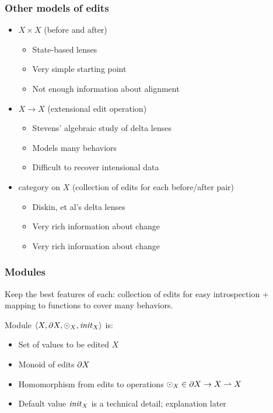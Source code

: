 \documentclass[table]{beamer}
\begin{document}
\begin{frame}
    \frametitle{Other models of edits}

    \begin{itemize}
        \item $X \times X$ (before and after)
            \begin{itemize}
                \item State-based lenses
                \item[\ybullet] Very simple starting point
                \item[\nbullet] Not enough information about alignment
            \end{itemize}
        \item $X \to X$ (extensional edit operation)
            \begin{itemize}
                \item Stevens' algebraic study of delta lenses
                \item[\ybullet] Models many behaviors
                \item[\nbullet] Difficult to recover intensional data
            \end{itemize}
        \item category on $X$ (collection of edits for each before/after
            pair)
            \begin{itemize}
                \item Diskin, et al's delta lenses
                \item[\ybullet] Very rich information about change
                \item[\nbullet] Very rich information about change
            \end{itemize}
    \end{itemize}
\end{frame}

\begin{frame}
    \frametitle{Modules}
    Keep the best features of each: collection of edits for easy
    introspection + mapping to functions to cover many behaviors.

    \vpause

    Module $\left<X,\partial X,\odot_X,\mathit{init}_X\right>$ is:
    \begin{itemize}
        \item Set of values to be edited $X$
        \item Monoid of edits $\partial X$
        \item Homomorphism from edits to operations $\odot_X \in \partial X \to X
            \rightharpoonup X$
        \item Default value $\mathit{init}_X$ is a technical detail; explanation
            later
    \end{itemize}
\end{frame}
\end{document}
